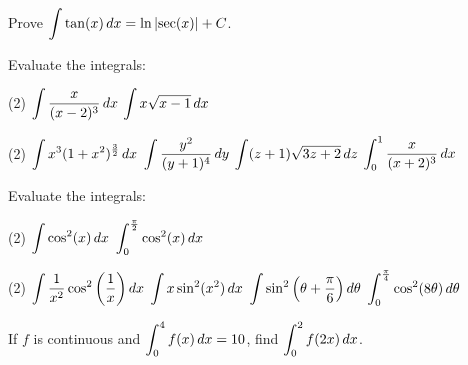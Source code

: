 \documentclass[answers]{exam}
\begin{document}
  \begin{ex*}
    Prove $\displaystyle\int \tan(x)\,dx=\ln{\left\vert\sec(x)\right\vert}+C$.
  \end{ex*}
  \begin{ex*}
    Evaluate the integrals:
  \end{ex*}
  \begin{tasks}[after-item-skip=\stretch{1}](2)
    \task $\displaystyle\int \frac{x}{(x-2)^3}\,dx$
    \task $\displaystyle\int x\sqrt{x-1}\,dx$
  \end{tasks}
  \pagebreak
  
  \begin{tasks}[after-item-skip=\stretch{1}, resume](2)
    \task $\displaystyle\int x^3(1+x^2)^\frac{3}{2}\,dx$
    \task $\displaystyle\int \frac{y^2}{(y+1)^4}\,dy$
    \task $\displaystyle\int (z+1)\sqrt{3z+2}\,dz$
    \task $\displaystyle\int_0^1 \frac{x}{(x+2)^3}\,dx$
  \end{tasks}
  \pagebreak

  \begin{center}
  \end{center}
  \begin{ex*}
    Evaluate the integrals:
  \end{ex*}
  \begin{tasks}[after-item-skip=\stretch{1}](2)
    \task $\displaystyle\int \cos^2(x)\,dx$
    \task $\displaystyle\int_{0}^{\frac{\pi}{2}}\cos^2(x)\,dx$
  \end{tasks}
  \pagebreak
  
  \begin{tasks}[after-item-skip=\stretch{1}, resume](2)
    \task $\displaystyle\int \frac{1}{x^2}\cos^2{\left(\frac{1}{x}\right)}\,dx$
    \task $\displaystyle\int x\sin^2(x^2)\,dx$
    \task $\displaystyle\int \sin^2{\left(\theta+\frac{\pi}{6}\right)}\,d\theta$
    \task $\displaystyle\int_{0}^{\frac{\pi}{4}} \cos^2(8\theta)\,d\theta$
  \end{tasks}
  \pagebreak
  
  \begin{ex*}
    If $f$ is continuous and $\displaystyle\int_0^4 f(x)\,dx=10$, find $\displaystyle\int_0^2 f(2x)\,dx$.
  \end{ex*}
  
\end{document}
